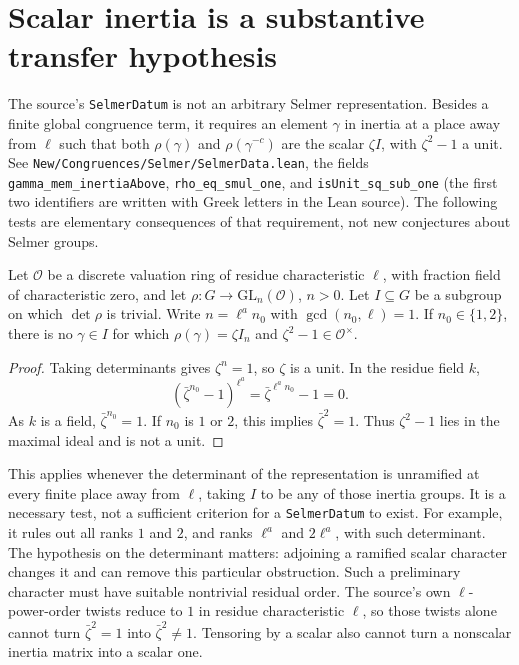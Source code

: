 \section{Scalar inertia is a substantive transfer hypothesis}

The source's \texttt{SelmerDatum} is not an arbitrary Selmer representation.
Besides a finite global congruence term, it requires an element $\gamma$ in
inertia at a place away from $\ell$ such that both $\rho(\gamma)$ and
$\rho(\gamma^{-c})$ are the scalar $\zeta I$, with $\zeta^2-1$ a unit.
See \texttt{New/Congruences/Selmer/SelmerData.lean}, the fields
\texttt{gamma\_mem\_inertiaAbove}, \texttt{rho\_eq\_smul\_one}, and
\texttt{isUnit\_sq\_sub\_one} (the first two identifiers are written with
Greek letters in the Lean source). The following tests are elementary
consequences of that requirement, not new conjectures about Selmer groups.

\begin{proposition}
Let $\mathcal O$ be a discrete valuation ring of residue characteristic
$\ell$, with fraction field of characteristic zero, and let
$\rho:G\longrightarrow\mathrm{GL}_n(\mathcal O)$, $n>0$.
Let $I\subseteq G$ be a subgroup on which $\det\rho$ is trivial. Write
$n=\ell^a n_0$ with $\gcd(n_0,\ell)=1$.
If $n_0\in\{1,2\}$, there is no $\gamma\in I$ for which
$\rho(\gamma)=\zeta I_n$ and $\zeta^2-1\in\mathcal O^\times$.
\end{proposition}
\begin{proof}
Taking determinants gives $\zeta^n=1$, so $\zeta$ is a unit. In the residue
field $k$,
\[
  (\bar\zeta^{n_0}-1)^{\ell^a}
       =\bar\zeta^{\ell^a n_0}-1=0.
\]
As $k$ is a field, $\bar\zeta^{n_0}=1$. If $n_0$ is $1$ or $2$, this
implies $\bar\zeta^2=1$. Thus $\zeta^2-1$ lies in the maximal ideal and is
not a unit.
\end{proof}

This applies whenever the determinant of the representation is unramified
at every finite place away from $\ell$, taking $I$ to be any of those
inertia groups. It is a necessary test, not a sufficient criterion for a
\texttt{SelmerDatum} to exist. For example, it rules out all ranks $1$ and
$2$, and ranks $\ell^a$ and $2\ell^a$, with such determinant. The hypothesis
on the determinant matters: adjoining a ramified scalar character changes
it and can remove this particular obstruction.
Such a preliminary character must have suitable nontrivial residual
order. The source's own $\ell$-power-order twists reduce to $1$ in
residue characteristic $\ell$, so those twists alone cannot turn
$\bar\zeta^2=1$ into $\bar\zeta^2\ne1$. Tensoring by a scalar also
cannot turn a nonscalar inertia matrix into a scalar one.

